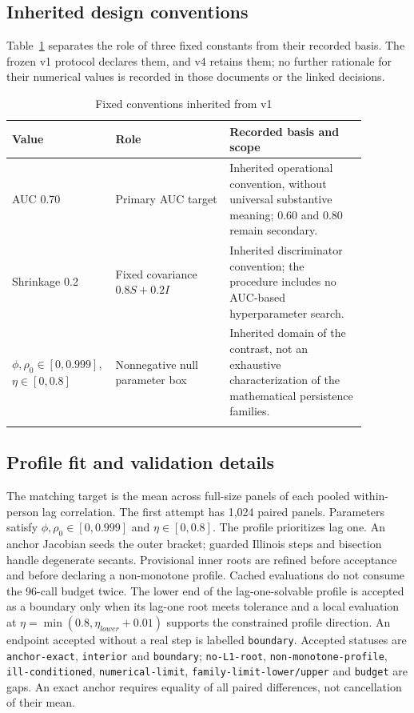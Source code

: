 \subsection*{Inherited design conventions}

Table~\ref{tab:design-conventions} separates the role of three fixed constants from their recorded basis. The frozen v1 protocol declares them, and v4 retains them; no further rationale for their numerical values is recorded in those documents or the linked decisions.
\begin{table}[h]
\caption{Fixed conventions inherited from v1}\label{tab:design-conventions}
\begin{tabular}{@{}p{0.22\linewidth}p{0.30\linewidth}p{0.36\linewidth}@{}}
\toprule
Value & Role & Recorded basis and scope \\
\midrule
AUC 0.70 & Primary AUC target & Inherited operational convention, without universal substantive meaning; 0.60 and 0.80 remain secondary. \\
Shrinkage 0.2 & Fixed covariance $0.8S+0.2I$ & Inherited discriminator convention; the procedure includes no AUC-based hyperparameter search. \\
$\phi,\rho_0\in[0,0.999]$, $\eta\in[0,0.8]$ & Nonnegative null parameter box & Inherited domain of the contrast, not an exhaustive characterization of the mathematical persistence families. \\
\botrule
\end{tabular}
\end{table}

\subsection*{Profile fit and validation details}

The matching target is the mean across full-size panels of each pooled within-person lag correlation. The first attempt has 1,024 paired panels. Parameters satisfy $\phi,\rho_0\in[0,0.999]$ and $\eta\in[0,0.8]$. The profile prioritizes lag one. An anchor Jacobian seeds the outer bracket; guarded Illinois steps and bisection handle degenerate secants. Provisional inner roots are refined before acceptance and before declaring a non-monotone profile. Cached evaluations do not consume the 96-call budget twice. The lower end of the lag-one-solvable profile is accepted as a boundary only when its lag-one root meets tolerance and a local evaluation at $\eta=\min(0.8,\eta_{lower}+0.01)$ supports the constrained profile direction. An endpoint accepted without a real step is labelled \texttt{boundary}. Accepted statuses are \texttt{anchor-exact}, \texttt{interior} and \texttt{boundary}; \texttt{no-L1-root}, \texttt{non-monotone-profile}, \texttt{ill-conditioned}, \texttt{numerical-limit}, \texttt{family-limit-lower/upper} and \texttt{budget} are gaps. An exact anchor requires equality of all paired differences, not cancellation of their mean.


